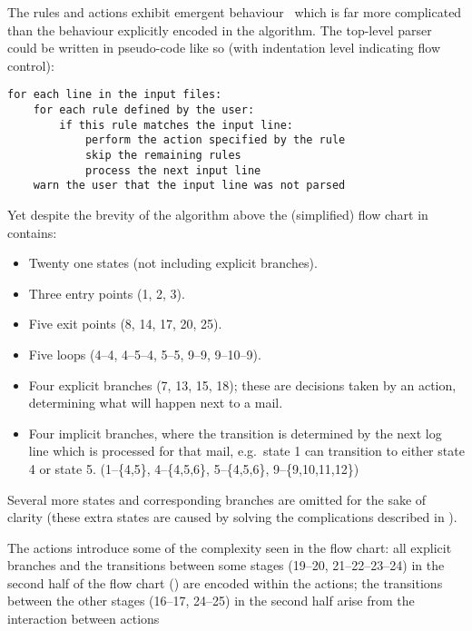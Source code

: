 The rules and actions exhibit emergent behaviour~\cite{Wikipedia-Emergence}
which is far more complicated than the behaviour explicitly encoded in the
algorithm.  The top-level parser could be written in pseudo-code like so
(with indentation level indicating flow control):

\begin{verbatim}
for each line in the input files:
    for each rule defined by the user:
        if this rule matches the input line:
            perform the action specified by the rule
            skip the remaining rules
            process the next input line
    warn the user that the input line was not parsed
\end{verbatim}

Yet despite the brevity of the algorithm above the (simplified) flow chart
in  contains:

\begin{itemize}

    \item Twenty one states (not including explicit branches).

    \item Three entry points (1, 2, 3).

    \item Five exit points (8, 14, 17, 20, 25).

    \item Five loops (4--4, 4--5--4, 5--5, 9--9, 9--10--9).

    \item Four explicit branches (7, 13, 15, 18); these are decisions taken
        by an action, determining what will happen next to a mail.

    \item Four implicit branches, where the transition is determined by the
        next log line which is processed for that mail, e.g.\ state 1 can
        transition to either state 4 or state 5.  (1--\{4,5\},
        4--\{4,5,6\}, 5--\{4,5,6\}, 9--\{9,10,11,12\})

\end{itemize}

Several more states and corresponding branches are omitted for the sake of
clarity (these extra states are caused by solving the complications
described in ).

The actions introduce some of the complexity seen in the flow chart: all
explicit branches and the transitions between some stages (19--20,
21--22--23--24) in the second half of the flow chart
() are encoded within the
actions; the transitions between the other stages (16--17, 24--25) in the
second half arise from the interaction between actions


